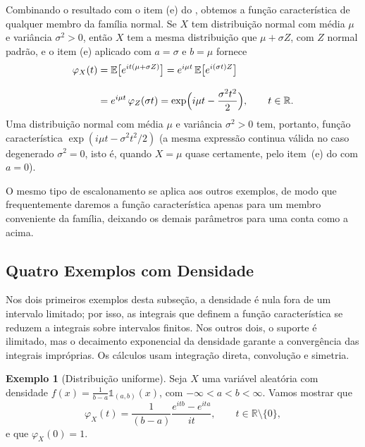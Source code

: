 \documentclass[12pt,portuguese]{article}
\theoremstyle{definition}
\newtheorem{example}[example]{Exemplo}
\theoremstyle{plainexercise}
\theoremstyle{starredexercise}
\theoremstyle{definition}
\begin{document}
\medskip
Combinando o resultado com o item (e) do , obtemos a
função característica de qualquer membro da família normal. Se $X$ tem
distribuição normal com média $\mu$ e variância $\sigma^2>0$, então
$X$ tem a mesma distribuição que $\mu+\sigma Z$, com $Z$ normal padrão, e o item
(e) aplicado com $a=\sigma$ e $b=\mu$ fornece
\begin{align*}
\varphi_X(t)
&=\mathbb{E}\bigl[e^{it(\mu+\sigma Z)}\bigr]
=e^{i\mu t}\,\mathbb{E}\bigl[e^{i(\sigma t)Z}\bigr]
\\[0.3cm]
&=e^{i\mu t}\,\varphi_Z(\sigma t)
=\exp\Bigl(i\mu t-\frac{\sigma^2t^2}{2}\Bigr), \qquad t\in\mathbb{R}.
\end{align*}
Uma distribuição normal com média $\mu$ e variância $\sigma^2>0$ tem, portanto,
função característica $\exp(i\mu t-\sigma^2t^2/2)$ (a mesma expressão continua
válida no caso degenerado $\sigma^2=0$, isto é, quando $X=\mu$ quase
certamente, pelo item~(e) do  com $a=0$).

O mesmo tipo de escalonamento se aplica aos outros exemplos, de modo que
frequentemente daremos a função característica apenas para um membro
conveniente da família, deixando os demais parâmetros para uma conta como a
acima.

\subsection{Quatro Exemplos com Densidade}\label{subsec:exemplos-continuos}

Nos dois primeiros exemplos desta subseção, a densidade é nula fora de um
intervalo limitado; por isso, as integrais que definem a função característica
se reduzem a integrais sobre intervalos finitos. Nos outros dois, o suporte é
ilimitado, mas o decaimento exponencial da densidade garante a convergência das
integrais impróprias. Os cálculos usam integração direta, convolução e simetria.

\begin{example}[Distribuição uniforme]\label{ex:uniforme}
Seja $X$ uma variável aleatória com densidade
$f(x)=\frac{1}{b-a}\mathds{1}_{(a,b)}(x)$, com $-\infty<a<b<\infty$. Vamos
mostrar que
\[
\varphi_X(t)=\frac{1}{(b-a)}\frac{e^{itb}-e^{ita}}{it}, \qquad
t\in\mathbb{R}\setminus\{0\},
\]
e que $\varphi_X(0)=1$.
\end{example}
\end{document}
